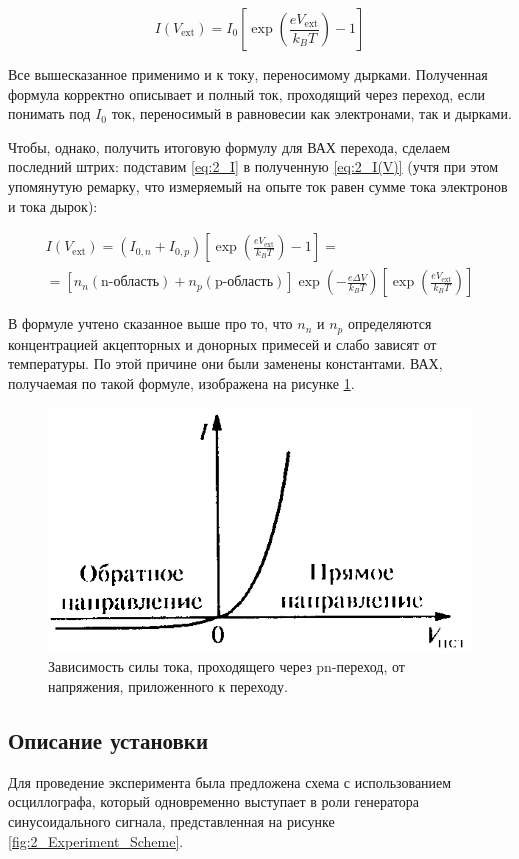 \documentclass[a4paper, 12pt]{article}
\begin{document}
\begin{equation}
	I(V_\text{ext}) = I_0 \left[\exp\left(\frac{e V_{\text{ext}}}{k_B T}\right) - 1\right]
	\label{eq:2_I(V)}
\end{equation}

Все вышесказанное применимо и к току, переносимому дырками. Полученная формула корректно описывает и полный ток, проходящий через переход, если понимать под $I_0$ ток, переносимый в равновесии как электронами, так и дырками.

Чтобы, однако, получить итоговую формулу для ВАХ перехода, сделаем последний штрих: подставим \ref{eq:2_I} в полученную \ref{eq:2_I(V)} (учтя при этом упомянутую ремарку, что измеряемый на опыте ток равен сумме тока электронов и тока дырок):

\begin{align*}
	I(V_{\text{ext}}) = (I_{0, n} + I_{0, p}) \left[\exp\left(\frac{e V_{\text{ext}}}{k_B T}\right) - 1\right] = \\ = [n_n(\text{n-область}) + n_p(\text{p-область})]\exp\left(-\frac{e \Delta V}{k_B T}\right) \left[\exp\left(\frac{e V_{\text{ext}}}{k_B T}\right)\right]
\end{align*}

В формуле учтено сказанное выше про то, что $n_n$ и $n_p$ определяются концентрацией акцепторных и донорных примесей и слабо зависят от температуры. По этой причине они были заменены константами. ВАХ, получаемая по такой формуле, изображена на рисунке \ref{fig:2_VAC}.

\begin{figure}[H]
	\centering
	\includegraphics[width=0.5\linewidth]{2_VAC}
	\caption{Зависимость силы тока, проходящего через pn-переход, от напряжения, приложенного к переходу.}
	\label{fig:2_VAC}
\end{figure}

\subsection{Описание установки}

Для проведение эксперимента была предложена схема с использованием осциллографа, который одновременно выступает в роли генератора синусоидального сигнала, представленная на рисунке \ref{fig:2_Experiment_Scheme}.
\end{document}
